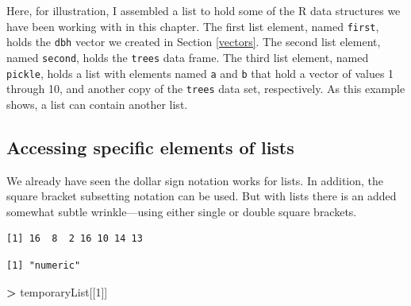 \documentclass[]{krantz}
\makeatletter
\newenvironment{Shaded}{\begin{snugshade}}{\end{snugshade}}
\newcommand{\DecValTok}[1]{\textcolor[rgb]{0.06,0.06,0.06}{#1}}
\newcommand{\KeywordTok}[1]{\textcolor[rgb]{0.27,0.27,0.27}{\textbf{#1}}}
\newcommand{\NormalTok}[1]{#1}
\newcommand{\OperatorTok}[1]{\textcolor[rgb]{0.43,0.43,0.43}{\textbf{#1}}}
\newcommand{\StringTok}[1]{\textcolor[rgb]{0.5,0.5,0.5}{#1}}
\newenvironment{kframe}{%
\medskip{}
\setlength{\fboxsep}{.8em}
 \def\at@end@of@kframe{}%
 \ifinner\ifhmode%
  \def\at@end@of@kframe{\end{minipage}}%
  \begin{minipage}{\columnwidth}%
 \fi\fi%
 \def\FrameCommand##1{\hskip\@totalleftmargin \hskip-\fboxsep
 \colorbox{shadecolor}{##1}\hskip-\fboxsep
     \hskip-\linewidth \hskip-\@totalleftmargin \hskip\columnwidth}%
 \MakeFramed {\advance\hsize-\width
   \@totalleftmargin\z@ \linewidth\hsize
   \@setminipage}}%
 {\par\unskip\endMakeFramed%
 \at@end@of@kframe}
\renewenvironment{Shaded}{\begin{kframe}}{\end{kframe}}
\makeatother
\begin{document}
Here, for illustration, I assembled a list to hold some of the R data structures we have been working with in this chapter. The first list element, named \texttt{first}, holds the \texttt{dbh} vector we created in Section \ref{vectors}. The second list element, named \texttt{second}, holds the \texttt{trees} data frame. The third list element, named \texttt{pickle}, holds a list with elements named \texttt{a} and \texttt{b} that hold a vector of values 1 through 10, and another copy of the \texttt{trees} data set, respectively. As this example shows, a list can contain another list.

\hypertarget{accessing-specific-elements-of-lists}{%
\subsection{Accessing specific elements of lists}\label{accessing-specific-elements-of-lists}}

We already have seen the dollar sign notation works for lists. In addition, the square bracket subsetting notation can be used. But with lists there is an added somewhat subtle wrinkle---using either single or double square brackets.

\begin{Shaded}
\end{Shaded}

\begin{verbatim}
[1] 16  8  2 16 10 14 13
\end{verbatim}

\begin{Shaded}
\end{Shaded}

\begin{verbatim}
[1] "numeric"
\end{verbatim}

\begin{Shaded}
\begin{Highlighting}[]
\OperatorTok{>}\StringTok{ }\NormalTok{temporaryList[[}\DecValTok{1}\NormalTok{]]}
\end{Highlighting}
\end{Shaded}
\end{document}
